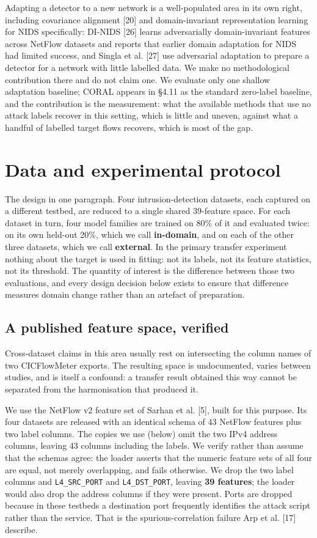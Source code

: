 \documentclass[11pt,a4paper]{article}
\begin{document}
Adapting a detector to a new network is a well-populated area in its own right, including covariance alignment [20] and domain-invariant representation learning for NIDS specifically: DI-NIDS [26] learns adversarially domain-invariant features across NetFlow datasets and reports that earlier domain adaptation for NIDS had limited success, and Singla et al. [27] use adversarial adaptation to prepare a detector for a network with little labelled data. We make no methodological contribution there and do not claim one. We evaluate only one shallow adaptation baseline; CORAL appears in §4.11 as the standard zero-label baseline, and the contribution is the measurement: what the available methods that use no attack labels recover in this setting, which is little and uneven, against what a handful of labelled target flows recovers, which is most of the gap.


\section{Data and experimental protocol}

The design in one paragraph. Four intrusion-detection datasets, each captured on a different testbed, are reduced to a single shared 39-feature space. For each dataset in turn, four model families are trained on 80\% of it and evaluated twice: on its own held-out 20\%, which we call \textbf{in-domain}, and on each of the other three datasets, which we call \textbf{external}. In the primary transfer experiment nothing about the target is used in fitting: not its labels, not its feature statistics, not its threshold. The quantity of interest is the difference between those two evaluations, and every design decision below exists to ensure that difference measures domain change rather than an artefact of preparation.

\subsection{A published feature space, verified}

Cross-dataset claims in this area usually rest on intersecting the column names of two CICFlowMeter exports. The resulting space is undocumented, varies between studies, and is itself a confound: a transfer result obtained this way cannot be separated from the harmonisation that produced it.

We use the NetFlow v2 feature set of Sarhan et al. [5], built for this purpose. Its four datasets are released with an identical schema of 43 NetFlow features plus two label columns. The copies we use (below) omit the two IPv4 address columns, leaving 43 columns including the labels. We verify rather than assume that the schemas agree: the loader asserts that the numeric feature sets of all four are equal, not merely overlapping, and fails otherwise. We drop the two label columns and \texttt{L4\_SRC\_PORT} and \texttt{L4\_DST\_PORT}, leaving \textbf{39 features}; the loader would also drop the address columns if they were present. Ports are dropped because in these testbeds a destination port frequently identifies the attack script rather than the service. That is the spurious-correlation failure Arp et al. [17] describe.
\end{document}
